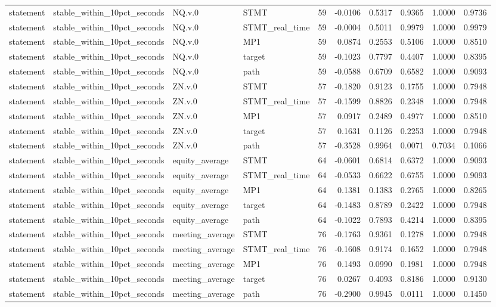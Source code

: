 \begin{tabular}{llllrrrrrr}
statement & stable_within_10pct_seconds & NQ.v.0 & STMT & 59 & -0.0106 & 0.5317 & 0.9365 & 1.0000 & 0.9736 \\
statement & stable_within_10pct_seconds & NQ.v.0 & STMT_real_time & 59 & -0.0004 & 0.5011 & 0.9979 & 1.0000 & 0.9979 \\
statement & stable_within_10pct_seconds & NQ.v.0 & MP1 & 59 & 0.0874 & 0.2553 & 0.5106 & 1.0000 & 0.8510 \\
statement & stable_within_10pct_seconds & NQ.v.0 & target & 59 & -0.1023 & 0.7797 & 0.4407 & 1.0000 & 0.8395 \\
statement & stable_within_10pct_seconds & NQ.v.0 & path & 59 & -0.0588 & 0.6709 & 0.6582 & 1.0000 & 0.9093 \\
statement & stable_within_10pct_seconds & ZN.v.0 & STMT & 57 & -0.1820 & 0.9123 & 0.1755 & 1.0000 & 0.7948 \\
statement & stable_within_10pct_seconds & ZN.v.0 & STMT_real_time & 57 & -0.1599 & 0.8826 & 0.2348 & 1.0000 & 0.7948 \\
statement & stable_within_10pct_seconds & ZN.v.0 & MP1 & 57 & 0.0917 & 0.2489 & 0.4977 & 1.0000 & 0.8510 \\
statement & stable_within_10pct_seconds & ZN.v.0 & target & 57 & 0.1631 & 0.1126 & 0.2253 & 1.0000 & 0.7948 \\
statement & stable_within_10pct_seconds & ZN.v.0 & path & 57 & -0.3528 & 0.9964 & 0.0071 & 0.7034 & 0.1066 \\
statement & stable_within_10pct_seconds & equity_average & STMT & 64 & -0.0601 & 0.6814 & 0.6372 & 1.0000 & 0.9093 \\
statement & stable_within_10pct_seconds & equity_average & STMT_real_time & 64 & -0.0533 & 0.6622 & 0.6755 & 1.0000 & 0.9093 \\
statement & stable_within_10pct_seconds & equity_average & MP1 & 64 & 0.1381 & 0.1383 & 0.2765 & 1.0000 & 0.8265 \\
statement & stable_within_10pct_seconds & equity_average & target & 64 & -0.1483 & 0.8789 & 0.2422 & 1.0000 & 0.7948 \\
statement & stable_within_10pct_seconds & equity_average & path & 64 & -0.1022 & 0.7893 & 0.4214 & 1.0000 & 0.8395 \\
statement & stable_within_10pct_seconds & meeting_average & STMT & 76 & -0.1763 & 0.9361 & 0.1278 & 1.0000 & 0.7948 \\
statement & stable_within_10pct_seconds & meeting_average & STMT_real_time & 76 & -0.1608 & 0.9174 & 0.1652 & 1.0000 & 0.7948 \\
statement & stable_within_10pct_seconds & meeting_average & MP1 & 76 & 0.1493 & 0.0990 & 0.1981 & 1.0000 & 0.7948 \\
statement & stable_within_10pct_seconds & meeting_average & target & 76 & 0.0267 & 0.4093 & 0.8186 & 1.0000 & 0.9130 \\
statement & stable_within_10pct_seconds & meeting_average & path & 76 & -0.2900 & 0.9945 & 0.0111 & 1.0000 & 0.1450 \\
\bottomrule
\end{tabular}
